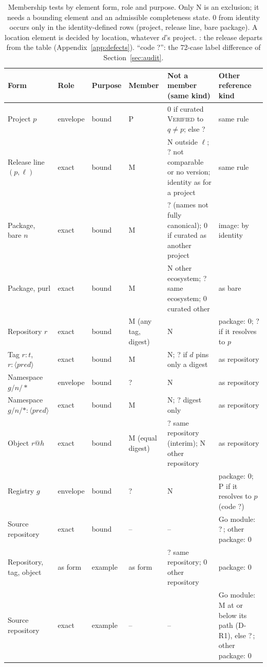 \documentclass[11pt,a4paper]{article}
\newcommand{\Mem}{\textsf{M}}
\newcommand{\Non}{\textsf{N}}
\newcommand{\Ind}{\textsf{?}}
\newcommand{\Proj}{\textsf{P}}
\newcommand{\NoA}{\textsf{0}}
\begin{document}
\begin{table}[h]
\centering
\scriptsize
\setlength{\tabcolsep}{3pt}
\begin{tabularx}{\linewidth}{@{}>{\raggedright\arraybackslash}p{2.3cm} l l >{\raggedright\arraybackslash}p{1.7cm} >{\raggedright\arraybackslash}X >{\raggedright\arraybackslash}p{3.3cm}@{}}
\toprule
Form & Role & Purpose & Member & Not a member (same kind) & Other reference kind \\
\midrule
Project $p$ & envelope & bound & \Proj{} & \NoA{} if curated
  \textsc{Verified} to $q \ne p$; else \Ind{}\,\ddag{} & same rule \\
Release line $(p,\ell)$ & exact & bound & \Mem{} & \Non{} outside
  $\ell$; \Ind{} not comparable or no version; identity as for a
  project\,\ddag{} & same rule \\
Package, bare $n$ & exact & bound & \Mem{} & \Ind{} (names not fully
  canonical); \NoA{} if curated as another project\,\ddag{} & image:
  by identity\,\ddag{} \\
Package, purl & exact & bound & \Mem{} & \Non{} other ecosystem; \Ind{}
  same ecosystem; \NoA{} curated other & as bare \\
Repository $r$ & exact & bound & \Mem{} (any tag, digest) & \Non{} &
  package: \NoA{}; \Ind{} if it resolves to $p$ \\
Tag $r{:}t$, $r{:}\langle\mathit{pred}\rangle$ & exact & bound & \Mem{}
  & \Non{}; \Ind{} if $d$ pins only a digest & as repository \\
Namespace $g/n/{*}$ & envelope & bound & \Ind{} & \Non{} & as
  repository \\
Namespace $g/n/{*}{:}\langle\mathit{pred}\rangle$ & exact & bound &
  \Mem{} & \Non{}; \Ind{} digest only & as repository \\
Object $r@h$ & exact & bound & \Mem{} (equal digest) & \Ind{} same
  repository (interim); \Non{} other repository & as repository \\
Registry $g$ & envelope & bound & \Ind{} & \Non{} & package: \NoA{};
  \Proj{} if it resolves to $p$ (code \Ind{}) \\
Source repository & exact & bound & -- & -- & Go module: \Ind{}\,\ddag{};
  other package: \NoA{} \\
Repository, tag, object & as form & example & as form & \Ind{} same
  repository; \NoA{} other repository & package: \NoA{} \\
Source repository & exact & example & -- & -- & Go module: \Mem{} at or
  below its path (D-R1), else \Ind{}\,\ddag{}; other package: \NoA{} \\
\bottomrule
\end{tabularx}
\caption{Membership tests by element form, role and purpose. Only
\Non{} is an exclusion; it needs a bounding element and an admissible
completeness state. \NoA{} from identity occurs only in the
identity-defined rows (project, release line, bare package). A
location element is decided by location, whatever $d$'s project.
\ddag: the release departs from the table (Appendix~\ref{app:defects}).
``code \Ind{}'': the 72-case label difference of
Section~\ref{sec:audit}.}
\label{tab:membership}
\end{table}
\end{document}
